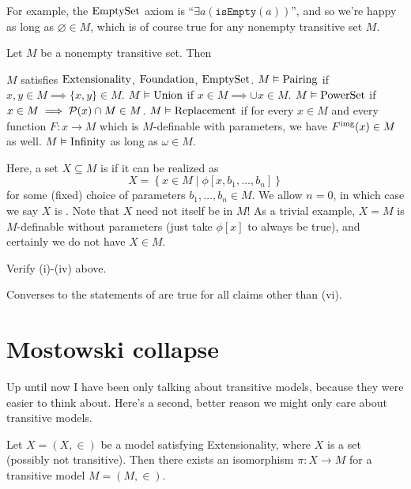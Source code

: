 For example, the $\mathrm{EmptySet}$ axiom is ``$\exists a (\mathtt{isEmpty}(a))$'',
and so we're happy as long as $\varnothing \in M$, which is of course
true for any nonempty transitive set $M$.

\begin{lemma}
	\label{lem:transitive_ZFC}
	Let $M$ be a nonempty transitive set. Then
	\begin{enumerate}[(i)]
		\ii $M$ satisfies $\mathrm{Extensionality}$, $\mathrm{Foundation}$, $\mathrm{EmptySet}$.
		\ii $M \vDash \mathrm{Pairing}$ if $x,y \in M \implies \{x,y\} \in M$.
		\ii $M \vDash \mathrm{Union}$ if $x \in M \implies \cup x \in M$.
		\ii $M \vDash \mathrm{PowerSet}$ if $x \in M \implies \mathcal P(x) \cap M \in M$.
		\ii $M \vDash \mathrm{Replacement}$ if for every $x \in M$
		and every function $F \colon x \to M$
		which is $M$-definable with parameters,
		we have $F^{\text{img}}(x) \in M$ as well.
		\ii $M \vDash \mathrm{Infinity}$ as long as $\omega \in M$.
	\end{enumerate}
\end{lemma}
Here, a set $X \subseteq M$ is 
if it can be realized as
\[ X = \left\{ x \in M \mid \phi[x, b_1, \dots, b_n] \right\} \]
for some (fixed) choice of parameters $b_1,\dots,b_n \in M$.
We allow $n=0$, in which case we say $X$ is .
Note that $X$ need not itself be in $M$!
As a trivial example, $X = M$ is $M$-definable without parameters
(just take $\phi[x]$ to always be true), and certainly we do not have $X \in M$.
\begin{exercise}
	Verify (i)-(iv) above.
\end{exercise}
\begin{remark}
	Converses to the statements of 
	are true for all claims other than (vi).
\end{remark}

\section{Mostowski collapse}
Up until now I have been only talking about transitive models,
because they were easier to think about.
Here's a second, better reason we might only care about transitive models.

\begin{lemma}
	Let $X = (X, \in)$ be a model satisfying Extensionality,
	where $X$ is a set (possibly not transitive).
	Then there exists an isomorphism $\pi \colon X \to M$ for
	a transitive model $M = (M,\in)$.
\end{lemma}

